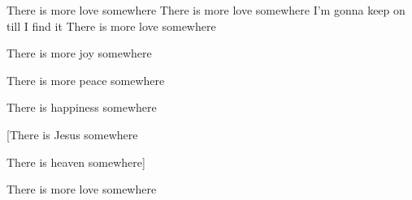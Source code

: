 
\contd
{}

\versemark
There is more love somewhere
There is more love somewhere
I’m gonna keep on till I find it
There is more love somewhere

\versemark
There is more joy somewhere\simile

\versemark
There is more peace somewhere\simile

\versemark
There is happiness somewhere\simile

[There is Jesus somewhere\simile

There is heaven somewhere\simile]

\versemark
There is more love somewhere\simile

